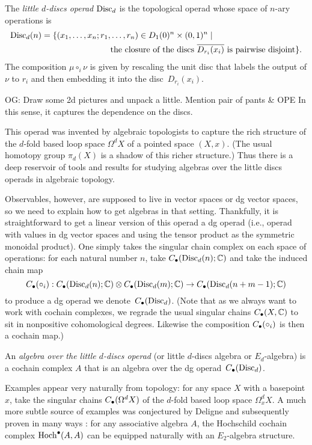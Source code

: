 \documentclass[11pt]{amsart}
\def\owen#1{{\textcolor{violet!50!black}{OG: {#1}}}}
\begin{document}
\begin{dfn}
The {\em little $d$-discs operad} ${\rm Disc}_d$ is the topological operad whose space of $n$-ary operations is
\begin{align*}
{\rm Disc}_d(n) = \{ (x_1, \ldots, x_n; r_1, &\ldots, r_n)  \in D_1(0)^n \times (0,1)^n \;|\; \\
&\text{the closure of the discs $\overline{D_{r_i}(x_i)}$ is pairwise disjoint}\}.
\end{align*}
The composition $\mu \circ_i \nu$ is given by rescaling the unit disc that labels the output of $\nu$ to $r_i$ and then embedding it into the disc~$D_{r_i}(x_i)$.
\end{dfn}

\owen{Draw some 2d pictures and unpack a little. Mention pair of pants \& OPE} 
In this sense, it captures the dependence on the discs.

This operad was invented by algebraic topologists to capture the rich structure of the $d$-fold based loop space $\Omega^d X$ of a pointed space $(X,x)$.
(The usual homotopy group $\pi_d(X)$ is a shadow of this richer structure.)
Thus there is a deep reservoir of tools and results for studying algebras over the little discs operads in algebraic topology.

Observables, however, are supposed to live in vector spaces or dg vector spaces,
so we need to explain how to get algebras in that setting.
Thankfully, it is straightforward to get a linear version of this operad a dg operad (i.e., operad with values in dg vector spaces and using the tensor product as the symmetric monoidal product).
One simply takes the singular chain complex on each space of operations:
for each natural number $n$, take $C_\bullet({\rm Disc}_d(n); \mathbb C)$ and take the induced chain map 
\[
C_\bullet(\circ_i): C_\bullet({\rm Disc}_d(n); \mathbb C) \otimes C_\bullet({\rm Disc}_d(m); \mathbb C) \to C_\bullet({\rm Disc}_d(n+m-1); \mathbb C)
\]
to produce a dg operad we denote~$C_\bullet({\rm Disc}_d)$.
(Note that as we always want to work with cochain complexes, we regrade the usual singular chains $C_\bullet(X, \mathbb C)$ to sit in nonpositive cohomological degrees. 
Likewise the composition $C_\bullet(\circ_i)$ is then a cochain map.)

\begin{dfn}
An {\em algebra over the little $d$-discs operad} (or little $d$-discs algebra or $E_d$-algebra) is a cochain complex $A$ that is an algebra over the dg operad~$C_\bullet({\rm Disc}_d)$.
\end{dfn}

Examples appear very naturally from topology: for any space $X$ with a basepoint $x$, take the singular chains $C_\bullet(\Omega^d X)$ of the $d$-fold based loop space $\Omega^d_x X$.
A much more subtle source of examples was conjectured by Deligne and subsequently proven in many ways \cite{}: 
for any associative algebra $A$, the Hochschild cochain complex ${\rm Hoch}^\bullet(A,A)$ can be equipped naturally with an $E_2$-algebra structure.
\end{document}
